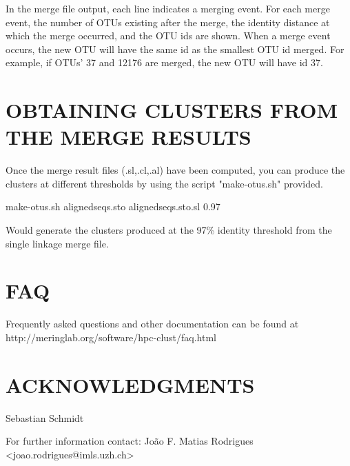 \documentclass[10pt,a4paper]{article}
\begin{document}
In the merge file output, each line indicates a merging event. For each merge event, the
number of OTUs existing after the merge, the identity distance at which the merge occurred,
and the OTU ids are shown. When a merge event occurs, the new OTU will have the same id 
as the smallest OTU id merged. For example, if OTUs' 37 and 12176 are merged, the new OTU
will have id 37.


\section{OBTAINING CLUSTERS FROM THE MERGE RESULTS}

Once the merge result files (.sl,.cl,.al) have been computed, you can produce the clusters
at different thresholds by using the script "make-otus.sh" provided.

make-otus.sh alignedseqs.sto alignedseqs.sto.sl 0.97

Would generate the clusters produced at the 97\% identity threshold from the single linkage
merge file.


\section{FAQ}
Frequently asked questions and other documentation can be found at
http://meringlab.org/software/hpc-clust/faq.html


\section*{ACKNOWLEDGMENTS}
Sebastian Schmidt




For further information contact: Jo\~ao F. Matias Rodrigues {\textless}joao.rodrigues@imls.uzh.ch\textgreater
\end{document}

